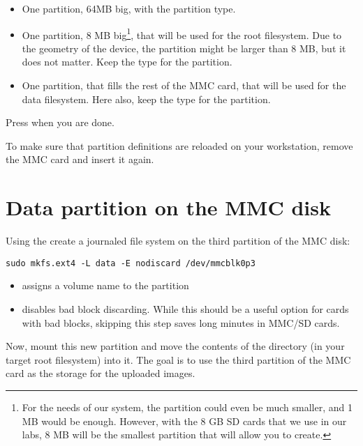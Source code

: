 \begin{itemize}

\item One partition, 64MB big, with the  partition type.

\item One partition, 8 MB big\footnote{For the needs of our system,
  the partition could even be much smaller, and 1 MB would be enough.
  However, with the 8 GB SD cards that we use in our labs, 8 MB will
  be the smallest partition that  will allow you to
  create.}, that will be used for the root filesystem. Due to the
  geometry of the device, the partition might be larger than 8 MB,
  but it does not matter. Keep the  type for the
  partition.

\item One partition, that fills the rest of the MMC card, that will be
  used for the data filesystem. Here also, keep the  type
  for the partition.

\end{itemize}

Press  when you are done.

To make sure that partition definitions are reloaded on your
workstation, remove the MMC card and insert it again.

\section{Data partition on the MMC disk}

Using the  create a journaled file system on the
third partition of the MMC disk:

\begin{verbatim}
sudo mkfs.ext4 -L data -E nodiscard /dev/mmcblk0p3
\end{verbatim}

\begin{itemize}
\item {} assigns a volume name to the partition
\item {} disables bad block discarding. While this
      should be a useful option for cards with bad blocks, skipping
      this step saves long minutes in MMC/SD cards. 
\end{itemize}

Now, mount this new partition and move the contents of the
 directory (in your target root filesystem) into
it. The goal is to use the third partition of the MMC card as the storage
for the uploaded images.

